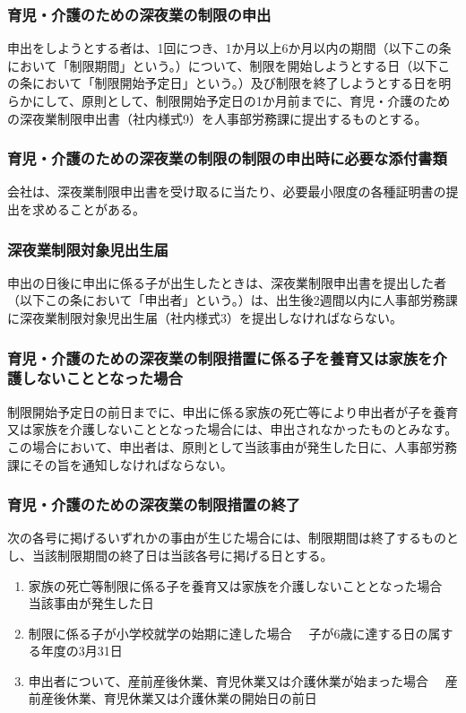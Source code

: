 \documentclass{jsarticle}
\begin{document}
\subsubsection{育児・介護のための深夜業の制限の申出}
\label{育介_項_育児・介護のための深夜業の制限の制限の申出}
申出をしようとする者は、1回につき、1か月以上6か月以内の期間（以下この条において「制限期間」という。）について、制限を開始しようとする日（以下この条において「制限開始予定日」という。）及び制限を終了しようとする日を明らかにして、原則として、制限開始予定日の1か月前までに、育児・介護のための深夜業制限申出書（社内様式9）を人事部労務課に提出するものとする。 

\subsubsection{育児・介護のための深夜業の制限の制限の申出時に必要な添付書類}
\label{育介_項_育児・介護のための深夜業の制限の制限の申出時に必要な添付書類}
会社は、深夜業制限申出書を受け取るに当たり、必要最小限度の各種証明書の提出を求めることがある。

\subsubsection{深夜業制限対象児出生届}
\label{育介_項_深夜業制限対象児出生届}
申出の日後に申出に係る子が出生したときは、深夜業制限申出書を提出した者（以下この条において「申出者」という。）は、出生後2週間以内に人事部労務課に深夜業制限対象児出生届（社内様式3）を提出しなければならない。 

\subsubsection{育児・介護のための深夜業の制限措置に係る子を養育又は家族を介護しないこととなった場合}
\label{育介_項_育児・介護のための深夜業の制限措置に係る子を養育又は家族を介護しないこととなった場合}
制限開始予定日の前日までに、申出に係る家族の死亡等により申出者が子を養育又は家族を介護しないこととなった場合には、申出されなかったものとみなす。この場合において、申出者は、原則として当該事由が発生した日に、人事部労務課にその旨を通知しなければならない。

\subsubsection{育児・介護のための深夜業の制限措置の終了}
\label{育介_項_育児・介護のための深夜業の制限措置の終了}
次の各号に掲げるいずれかの事由が生じた場合には、制限期間は終了するものとし、当該制限期間の終了日は当該各号に掲げる日とする。
\begin{enumerate}
  \item 家族の死亡等制限に係る子を養育又は家族を介護しないこととなった場合\label{enum:育介_項_育児・介護のための深夜業の制限措置の終了_子・家族の死亡等}
        　当該事由が発生した日 
  \item 制限に係る子が小学校就学の始期に達した場合
        　子が6歳に達する日の属する年度の3月31日 
  \item 申出者について、産前産後休業、育児休業又は介護休業が始まった場合
        　産前産後休業、育児休業又は介護休業の開始日の前日
\end{enumerate}
\end{document}
